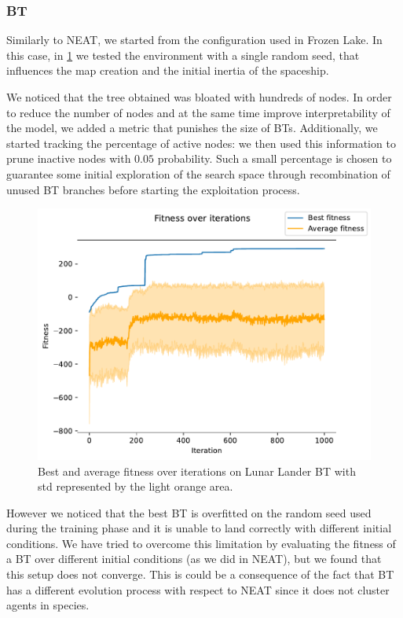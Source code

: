 \subsubsection{BT}
Similarly to NEAT, we started from the configuration used in Frozen Lake. In this case, in \cref{fig:fitness-bt-lunar-lander} we tested the environment with a single random seed, that influences the map creation and the initial inertia of the spaceship.

We noticed that the tree obtained was bloated with hundreds of nodes. In order to reduce the number of nodes and at the same time improve interpretability of the model, we added a metric that punishes the size of BTs. Additionally, we started tracking the percentage of active nodes: we then used this information to prune inactive nodes with \(0.05\) probability. Such a small percentage is chosen to guarantee some initial exploration of the search space through recombination of unused BT branches before starting the exploitation process.

\begin{figure}
    \centering
    \includegraphics[width=0.8\linewidth]{./images/fitness_over_iterations_lunar_lander_bt.pdf}
    \caption{Best and average fitness over iterations on Lunar Lander BT with std represented by the light orange area.}
    \label{fig:fitness-bt-lunar-lander}
\end{figure}

However we noticed that the best BT is overfitted on the random seed used during the training phase and it is unable to land correctly with different initial conditions. We have tried to overcome this limitation by evaluating the fitness of a BT over different initial conditions (as we did in NEAT), but we found that this setup does not converge. This is could be a consequence of the fact that BT has a different evolution process with respect to NEAT since it does not cluster agents in species.

